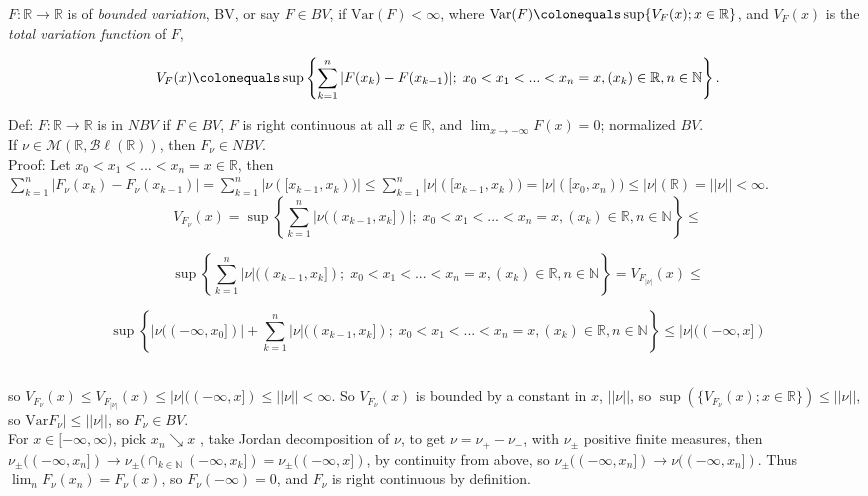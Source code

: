 \documentclass[12pt]{article}
\newcommand{\rarw}[0] { \rightarrow }
\newcommand{ \defeq }[0] { \colonequals }
\newcommand{\nats}[0] { \mathbb{N}}
\newcommand{\reals}[0] { \mathbb{R}}
\newcommand{\M}[0] { \mathcal{M} }
\newcommand{\Bl}[0] { \mathcal{B} \ell }
\newcommand{ \Var } { \textrm{Var} }
\begin{document}
$F: \reals \rarw \reals$ is of \emph{bounded variation}, BV, or say $F \in BV$, if $\Var(F) < \infty$, where $\Var(F) \defeq \sup\{ V_F(x); x \in \reals \}$, and $V_F(x)$ is the \emph{total variation function} of $F$,

$$
V_F(x) \defeq \sup \left\{  \sum_{k=1}^n |F(x_k) - F(x_{k-1})| ; \;  x_0    < x_1 < ... < x_n=x, ( x_k ) \in \reals, n \in \nats \right\}.
$$

Def: $F: \reals \rarw \reals$ is in $NBV$ if $F \in BV$, $F$ is right continuous at all $x \in \reals$, and $\lim_{x \rarw -\infty} F(x) = 0$; normalized $BV$.\\

If $\nu \in \M(\reals, \Bl(\reals))$, then $F_\nu \in NBV$. \\

\noindent
Proof: Let $x_0 < x_1 < ... < x_n = x \in \reals$, then $\sum_{k=1}^n |F_\nu(x_k) - F_\nu(x_{k-1})| = \sum_{k=1}^n |\nu([x_{k-1}, x_{k}))| \le \sum_{k=1}^n |\nu|([x_{k-1}, x_{k})) = |\nu|([x_0,x_n)) \le |\nu|(\reals) = ||\nu|| < \infty$. \\




$$
V_{F_\nu}(x) = \sup \left\{  \sum_{k=1}^n | \nu(( x_{k-1},x_k ]) | ; \;  x_0    < x_1 < ... < x_n=x, ( x_k ) \in \reals, n \in \nats \right\} \le 
$$

$$
\sup \left\{  \sum_{k=1}^n |\nu|(( x_{k-1},x_k ]) ; \;  x_0    < x_1 < ... < x_n=x, ( x_k ) \in \reals, n \in \nats \right\}  = V_{F_{|\nu|}}(x)  \le 
$$

$$ \sup \left\{  |\nu((-\infty,x_0])| + \sum_{k=1}^n | \nu | (( x_{k-1},x_k ]); \;  x_0    < x_1 < ... < x_n=x, ( x_k ) \in \reals, n \in \nats \right\} \le |\nu|((-\infty,x])
$$  \\


\noindent

so $ V_{F_\nu}(x) \le V_{F_{|\nu|}}(x)  \le  |\nu|((-\infty,x]) \le ||\nu|| < \infty$. So $V_{F_\nu}(x)$ is bounded by a constant in $x$, $||\nu||$, so $\sup(\{ V_{F_\nu}(x); x \in \reals \}) \le ||\nu||$, so $\Var{F_\nu|} \le ||\nu||$, so $F_\nu \in BV$.   \\

For $x \in [-\infty,\infty)$, pick $x_n \searrow x$ , take Jordan decomposition of $\nu$, to get $\nu = \nu_+ - \nu_-$, with $\nu_\pm$ positive finite measures, then $\nu_\pm((-\infty,x_n]) \rarw \nu_\pm(\cap_{k \in \nats} (-\infty,x_k]) = \nu_\pm((-\infty,x]) $, by continuity from above, so $\nu_\pm((-\infty,x_n]) \rarw \nu((-\infty,x_n])$. Thus $\lim_n F_\nu(x_n) = F_\nu(x)$, so $F_\nu(-\infty) = 0$, and $F_\nu$ is right continuous by definition.  \\
\end{document}
